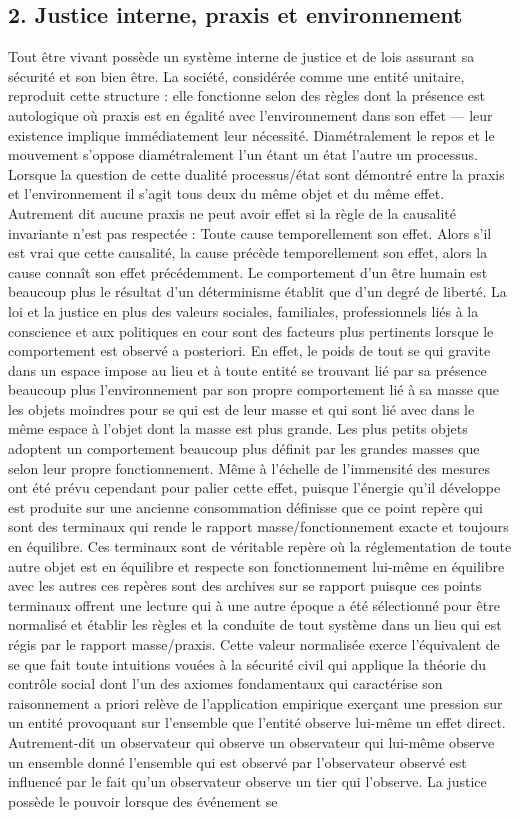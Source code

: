 \documentclass[12pt,a4paper]{article}
\begin{document}
\subsection*{2. Justice interne, praxis et environnement}
Tout être vivant possède un système interne de justice et de lois assurant sa sécurité et son bien être. La société, considérée comme une entité unitaire, reproduit cette structure : elle fonctionne selon des règles dont la présence est autologique où praxis est en égalité avec l’environnement dans son effet — leur existence implique immédiatement leur nécessité. Diamétralement le repos et le mouvement s’oppose diamétralement l’un étant un état l’autre un processus. Lorsque la question de cette dualité processus/état sont démontré entre la praxis et l’environnement il s’agit tous deux du même objet et du même effet. Autrement dit aucune praxis ne peut avoir effet si la règle de la causalité invariante n’est pas respectée : Toute cause temporellement son effet. Alors s’il est vrai que cette causalité, la cause précède temporellement son effet, alors la cause connaît son effet précédemment. Le comportement d’un être humain est beaucoup plus le résultat d’un déterminisme établit que d’un degré de liberté. La loi et la justice en plus des valeurs sociales, familiales, professionnels liés à la conscience et aux politiques en cour sont des facteurs plus pertinents lorsque le comportement est observé a posteriori. En effet, le poids de tout se qui gravite dans un espace impose au lieu et à toute entité se trouvant lié par sa présence beaucoup plus l’environnement par son propre comportement lié à sa masse que les objets moindres pour se qui est de leur masse et qui sont lié avec dans le même espace à l’objet dont la masse est plus grande. Les plus petits objets adoptent un comportement beaucoup plus définit par les grandes masses que selon leur propre fonctionnement. Même à l’échelle de l’immensité des mesures ont été prévu cependant pour palier cette effet, puisque l’énergie qu’il développe est produite sur une ancienne consommation définisse que ce point repère qui sont des terminaux qui rende le rapport masse/fonctionnement exacte et toujours en équilibre. Ces terminaux sont de véritable repère où la réglementation de toute autre objet est en équilibre et respecte son fonctionnement lui-même en équilibre avec les autres ces repères sont des archives sur se rapport puisque ces points terminaux offrent une lecture qui à une autre époque a été sélectionné pour être normalisé et établir les règles et la conduite de tout système dans un lieu qui est régis par le rapport masse/praxis. Cette valeur normalisée exerce l’équivalent de se que fait toute intuitions vouées à la sécurité civil qui applique la théorie du contrôle social dont l’un des axiomes fondamentaux qui caractérise son raisonnement a priori relève de l’application empirique exerçant une pression sur un entité provoquant sur l’ensemble que l’entité observe lui-même un effet direct. Autrement-dit un observateur qui observe un observateur qui lui-même observe un ensemble donné l’ensemble qui est observé par l’observateur observé est influencé par le fait qu’un observateur observe un tier qui l’observe. La justice possède le pouvoir lorsque des événement se 
\end{document}
